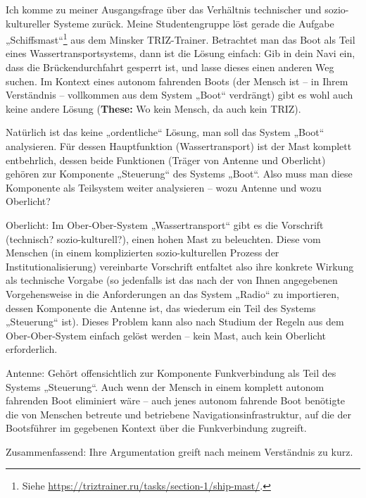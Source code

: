 \documentclass[11pt,a4paper]{article}
\begin{document}
Ich komme zu meiner Ausgangsfrage über das Verhältnis technischer und
sozio-kultureller Systeme zurück. Meine Studentengruppe löst gerade die
Aufgabe „Schiffsmast“\footnote{Siehe
  \url{https://triztrainer.ru/tasks/section-1/ship-mast/}.} aus dem Minsker
TRIZ-Trainer.  Betrachtet man das Boot als Teil eines Wassertransportsystems,
dann ist die Lösung einfach: Gib in dein Navi ein, dass die Brückendurchfahrt
gesperrt ist, und lasse dieses einen anderen Weg suchen. Im Kontext eines
autonom fahrenden Boots (der Mensch ist -- in Ihrem Verständnis -- vollkommen
aus dem System „Boot“ verdrängt) gibt es wohl auch keine andere Lösung
(\textbf{These:} Wo kein Mensch, da auch kein TRIZ).

Natürlich ist das keine „ordentliche“ Lösung, man soll das System „Boot“
analysieren.  Für dessen Hauptfunktion (Wassertransport) ist der Mast komplett
entbehrlich, dessen beide Funktionen (Träger von Antenne und Oberlicht)
gehören zur Komponente „Steuerung“ des Systems „Boot“. Also muss man diese
Komponente als Teilsystem weiter analysieren -- wozu Antenne und wozu
Oberlicht?

Oberlicht: Im Ober-Ober-System „Wassertransport“ gibt es die Vorschrift
(technisch? sozio-kulturell?), einen hohen Mast zu beleuchten.  Diese vom
Menschen (in einem komplizierten sozio-kulturellen Prozess der
Institutionalisierung) vereinbarte Vorschrift entfaltet also ihre konkrete
Wirkung als technische Vorgabe (so jedenfalls ist das nach der von Ihnen
angegebenen Vorgehensweise in die Anforderungen an das System „Radio“ zu
importieren, dessen Komponente die Antenne ist, das wiederum ein Teil des
Systems „Steuerung“ ist). Dieses Problem kann also nach Studium der Regeln aus
dem Ober-Ober-System einfach gelöst werden -- kein Mast, auch kein Oberlicht
erforderlich.

Antenne: Gehört offensichtlich zur Komponente Funkverbindung als Teil des
Systems „Steuerung“. Auch wenn der Mensch in einem komplett autonom fahrenden
Boot eliminiert wäre -- auch jenes autonom fahrende Boot benötigte die von
Menschen betreute und betriebene Navigationsinfrastruktur, auf die der
Bootsführer im gegebenen Kontext über die Funkverbindung zugreift.

Zusammenfassend: Ihre Argumentation greift nach meinem Verständnis zu kurz. 
\end{document}
